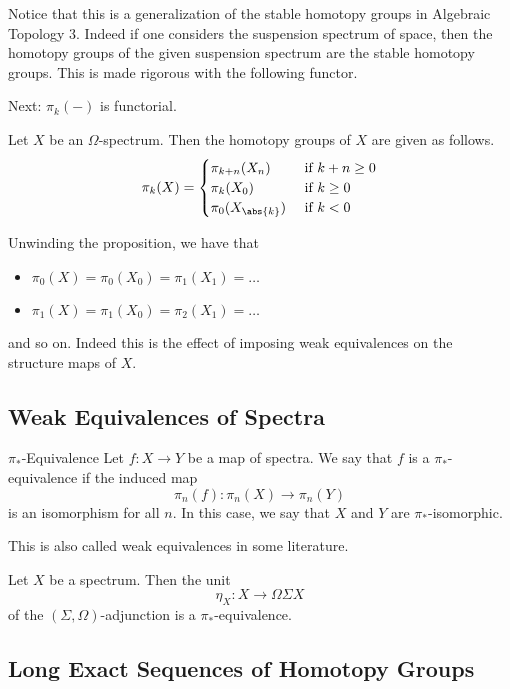 \documentclass[a4paper]{article}
\begin{document}
Notice that this is a generalization of the stable homotopy groups in Algebraic Topology 3. Indeed if one considers the suspension spectrum of space, then the homotopy groups of the given suspension spectrum are the stable homotopy groups. This is made rigorous with the following functor. 

Next: $\pi_k(-)$ is functorial. 

\begin{prp}{}{} Let $X$ be an $\Omega$-spectrum. Then the homotopy groups of $X$ are given as follows. $$\pi_k(X)=\begin{cases}
\pi_{k+n}(X_n) & \text{ if } k+n\geq 0\\
\pi_k(X_0) & \text{ if } k\geq 0\\
\pi_0(X_{\abs{k}}) & \text{ if } k<0
\end{cases}$$
\end{prp}

Unwinding the proposition, we have that 
\begin{itemize}
\item $\pi_0(X)=\pi_0(X_0)=\pi_1(X_1)=\dots$
\item $\pi_1(X)=\pi_1(X_0)=\pi_2(X_1)=\dots$
\end{itemize}
and so on. Indeed this is the effect of imposing weak equivalences on the structure maps of $X$. 

\subsection{Weak Equivalences of Spectra}
\begin{defn}{$\pi_\ast$-Equivalence}{} Let $f:X\to Y$ be a map of spectra. We say that $f$ is a $\pi_\ast$-equivalence if the induced map $$\pi_n(f):\pi_n(X)\to\pi_n(Y)$$ is an isomorphism for all $n$. In this case, we say that $X$ and $Y$ are $\pi_\ast$-isomorphic. 
\end{defn}

This is also called weak equivalences in some literature. 

\begin{prp}{}{} Let $X$ be a spectrum. Then the unit $$\eta_X:X\to\Omega\Sigma X$$ of the $(\Sigma,\Omega)$-adjunction is a $\pi_\ast$-equivalence. 
\end{prp}

\subsection{Long Exact Sequences of Homotopy Groups}
\end{document}

